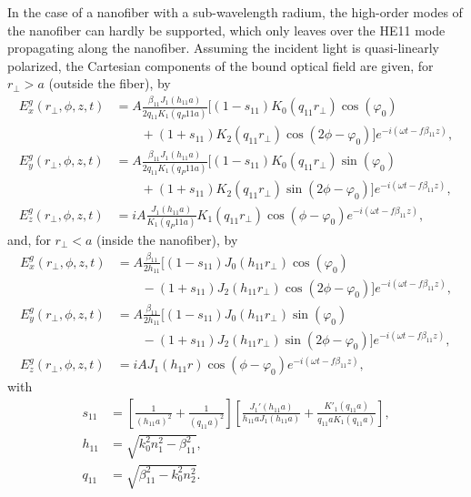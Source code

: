 \documentclass[]{report}
\begin{document}
In the case of a nanofiber with a sub-wavelength radium, the high-order modes of the nanofiber can hardly be supported, which only leaves over the HE11 mode propagating along the nanofiber. Assuming the incident light is quasi-linearly polarized, the Cartesian components of the bound optical field are given, for $ r_\perp>a $ (outside the fiber), by~\cite{Lacroute2012,LeKien2004}
\begin{subequations}
\label{Ertrga}
\begin{align}
E_x^g(r_\perp,\phi,z,t) &= A \frac{\beta_{11}J_1(h_{11}a)}{2q_{11}K_1(q_P{11}a)}[(1-s_{11})K_0(q_{11}r_\perp)\cos (\varphi_0) \nonumber\\
&\qquad + (1+s_{11})K_2 (q_{11}r_\perp) \cos (2\phi-\varphi_0) ] e^{-i(\omega t-f\beta_{11}z)},\\
E_y^g(r_\perp,\phi,z,t) &= A \frac{\beta_{11}J_1(h_{11}a)}{2q_{11}K_1(q_P{11}a)}[(1-s_{11})K_0(q_{11}r_\perp)\sin (\varphi_0) \nonumber\\
&\qquad + (1+s_{11})K_2 (q_{11}r_\perp) \sin (2\phi-\varphi_0) ] e^{-i(\omega t-f\beta_{11}z)},\\
E_z^g(r_\perp,\phi,z,t) &= iA \frac{J_1(h_{11}a)}{K_1(q_P{11}a)}K_1(q_{11}r_\perp)\cos (\phi-\varphi_0) e^{-i(\omega t-f\beta_{11}z)},
\end{align}
\end{subequations}
and, for $ r_\perp<a $ (inside the nanofiber), by
\begin{subequations}
\label{Ertrla}
\begin{align}
E_x^g(r_\perp,\phi,z,t) &= A \frac{\beta_{11}}{2h_{11}}[(1-s_{11})J_0(h_{11}r_\perp)\cos (\varphi_0) \nonumber\\
&\qquad - (1+s_{11})J_2 (h_{11}r_\perp) \cos (2\phi-\varphi_0) ] e^{-i(\omega t-f\beta_{11}z)},\\
E_y^g(r_\perp,\phi,z,t) &= A \frac{\beta_{11}}{2h_{11}}[(1-s_{11})J_0(h_{11}r_\perp)\sin (\varphi_0) \nonumber\\
&\qquad - (1+s_{11})J_2 (h_{11}r_\perp) \sin (2\phi-\varphi_0) ] e^{-i(\omega t-f\beta_{11}z)},\\
E_z^g(r_\perp,\phi,z,t) &= iA J_1(h_{11}r)\cos (\phi-\varphi_0) e^{-i(\omega t-f\beta_{11}z)},
\end{align}
\end{subequations}
with
\begin{subequations}
\begin{align}
s_{11} &= \left[\frac{1}{(h_{11}a)^2}+ \frac{1}{(q_{11}a)^2} \right] \left[ \frac{J_1'(h_{11}a)}{h_{11}aJ_1(h_{11}a)} + \frac{K'_1(q_{11}a)}{q_{11}aK_1(q_{11}a)} \right],\\
h_{11} &= \sqrt{k_0^2 n_1^2-\beta_{11}^2},\\
q_{11} &= \sqrt{\beta^2_{11}-k_0^2 n_2^2}.
\end{align}
\end{subequations}
\end{document}
